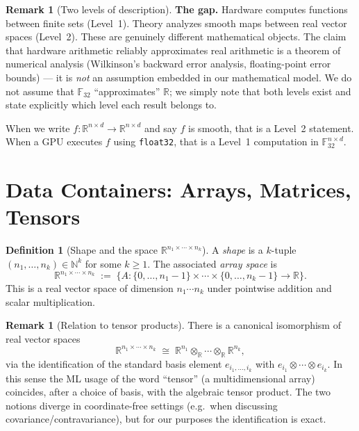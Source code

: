 \documentclass[11pt]{amsart}
\theoremstyle{plain}
\theoremstyle{definition}
\newtheorem{definition}[theorem]{Definition}
\newtheorem{remark}[theorem]{Remark}
\begin{document}
\begin{remark}[Two levels of description]
\medskip
\noindent\textbf{The gap.} Hardware computes functions between finite sets (Level~1).
Theory analyzes smooth maps between real vector spaces (Level~2).  These are
genuinely different mathematical objects.  The claim that hardware arithmetic
reliably approximates real arithmetic is a theorem of numerical analysis
(Wilkinson's backward error analysis, floating-point error bounds) — it is
\emph{not} an assumption embedded in our mathematical model.  We do not assume
that $\mathbb{F}_{32}$ ``approximates'' $\mathbb{R}$; we simply note that both
levels exist and state explicitly which level each result belongs to.

When we write $f : \mathbb{R}^{n \times d} \to \mathbb{R}^{n \times d}$ and say
$f$ is smooth, that is a Level~2 statement.  When a GPU executes $f$ using
\texttt{float32}, that is a Level~1 computation in $\mathbb{F}_{32}^{n \times d}$.
\end{remark}

\section{Data Containers: Arrays, Matrices, Tensors}
\label{sec:data-containers}

\begin{definition}[Shape and the space $\mathbb{R}^{n_1 \times \cdots \times n_k}$]
A \emph{shape} is a $k$-tuple $(n_1, \ldots, n_k) \in \mathbb{N}^k$ for some
$k \geq 1$.  The associated \emph{array space} is
\[
    \mathbb{R}^{n_1 \times \cdots \times n_k}
    \;:=\;
    \{ A : \{0,\ldots,n_1-1\} \times \cdots \times \{0,\ldots,n_k-1\} \to \mathbb{R} \}.
\]
This is a real vector space of dimension $n_1 \cdots n_k$ under pointwise
addition and scalar multiplication.
\end{definition}

\begin{remark}[Relation to tensor products]
There is a canonical isomorphism of real vector spaces
\[
    \mathbb{R}^{n_1 \times \cdots \times n_k}
    \;\cong\;
    \mathbb{R}^{n_1} \otimes_{\mathbb{R}} \cdots \otimes_{\mathbb{R}} \mathbb{R}^{n_k},
\]
via the identification of the standard basis element $e_{i_1,\ldots,i_k}$ with
$e_{i_1} \otimes \cdots \otimes e_{i_k}$.  In this sense the ML usage of the
word ``tensor'' (a multidimensional array) coincides, after a choice of basis,
with the algebraic tensor product.  The two notions diverge in coordinate-free
settings (e.g.\ when discussing covariance/contravariance), but for our
purposes the identification is exact.
\end{remark}
\end{document}
